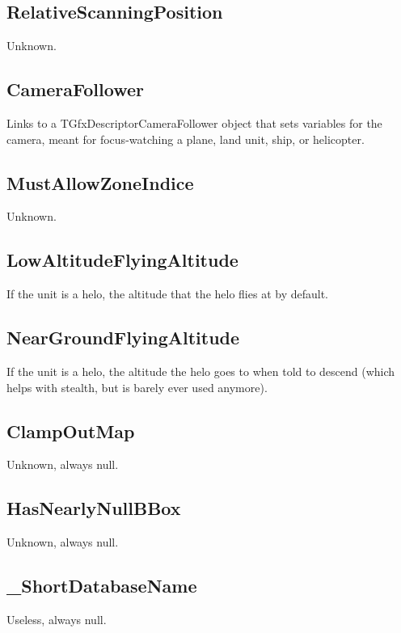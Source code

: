 \documentclass{article}
\begin{document}
\subsection{RelativeScanningPosition}

Unknown.

\subsection{CameraFollower}

Links to a TGfxDescriptorCameraFollower object that sets variables for the camera, meant for focus-watching a plane, land unit, ship, or helicopter.

\subsection{MustAllowZoneIndice}

Unknown.

\subsection{LowAltitudeFlyingAltitude}

If the unit is a helo, the altitude that the helo flies at by default.

\subsection{NearGroundFlyingAltitude}

If the unit is a helo, the altitude the helo goes to when told to descend (which helps with stealth, but is barely ever used anymore).

\subsection{ClampOutMap}

Unknown, always null.

\subsection{HasNearlyNullBBox}

Unknown, always null.

\subsection{\_ShortDatabaseName}

Useless, always null.
\end{document}
